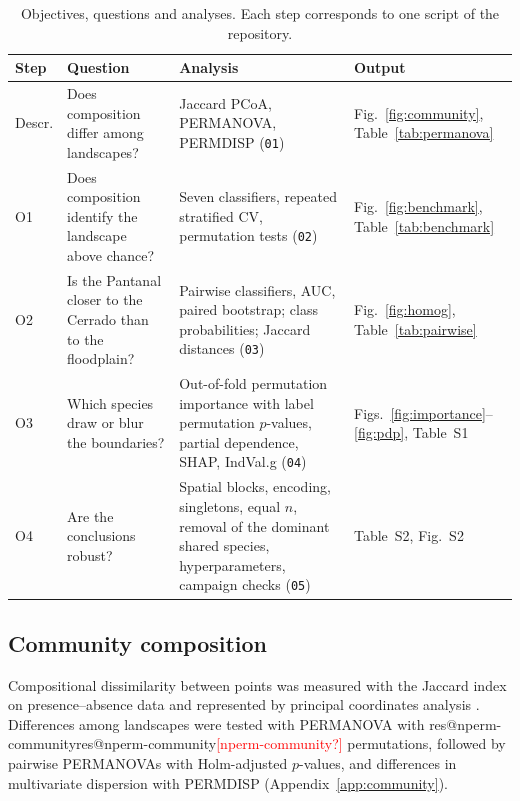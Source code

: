 \documentclass[10pt,a4paper,twocolumn]{article}
\makeatletter
\newcommand{\res}[1]{\ifcsname res@#1\endcsname\csname res@#1\endcsname\else\textcolor{red}{[#1?]}\fi}
\makeatother
\begin{document}
\begin{table}[t]
\centering
\caption{Objectives, questions and analyses. Each step corresponds to one script of the repository.}
\label{tab:strategy}
\small
\begin{tabular}{p{1.1cm}p{4.4cm}p{5.2cm}p{3.6cm}}
\toprule
Step & Question & Analysis & Output\\
\midrule
Descr. & Does composition differ among landscapes? & Jaccard PCoA, PERMANOVA, PERMDISP
(\texttt{01}) & Fig.~\ref{fig:community}, Table~\ref{tab:permanova}\\
O1 & Does composition identify the landscape above chance? & Seven classifiers, repeated
stratified CV, permutation tests (\texttt{02}) & Fig.~\ref{fig:benchmark},
Table~\ref{tab:benchmark}\\
O2 & Is the Pantanal closer to the Cerrado than to the floodplain? & Pairwise classifiers, AUC,
paired bootstrap; class probabilities; Jaccard distances (\texttt{03}) &
Fig.~\ref{fig:homog}, Table~\ref{tab:pairwise}\\
O3 & Which species draw or blur the boundaries? & Out-of-fold permutation importance with label
permutation $p$-values, partial dependence, SHAP, IndVal.g (\texttt{04}) &
Figs.~\ref{fig:importance}--\ref{fig:pdp}, Table~S1\\
O4 & Are the conclusions robust? & Spatial blocks, encoding, singletons, equal $n$, removal of
the dominant shared species, hyperparameters, campaign checks (\texttt{05}) & Table~S2,
Fig.~S2\\
\bottomrule
\end{tabular}
\end{table}

\subsection{Community composition}\label{sec:mcommunity}
Compositional dissimilarity between points was measured with the Jaccard index on presence--absence
data and represented by principal coordinates analysis \citep[PCoA;][]{gower1966}. Differences among
landscapes were tested with PERMANOVA \citep{anderson2001} with \res{nperm-community} permutations,
followed by pairwise PERMANOVAs with Holm-adjusted $p$-values, and differences in multivariate
dispersion with PERMDISP \citep{anderson2006} (Appendix~\ref{app:community}).
\end{document}
